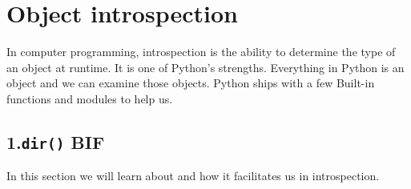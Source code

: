 \documentclass[a4paper,12pt,oneside]{sphinxmanual}
\begin{document}
\chapter{Object introspection}
\label{object_introspection:object-introspection}\label{object_introspection::doc}
In computer programming, introspection is the ability to determine the
type of an object at runtime. It is one of Python's strengths.
Everything in Python is an object and we can examine those objects.
Python ships with a few Built-in functions and modules to help us.


\section{1.\texttt{dir()} BIF}
\label{object_introspection:dir-bif}
In this section we will learn about  and how it facilitates us
in introspection.
\end{document}
